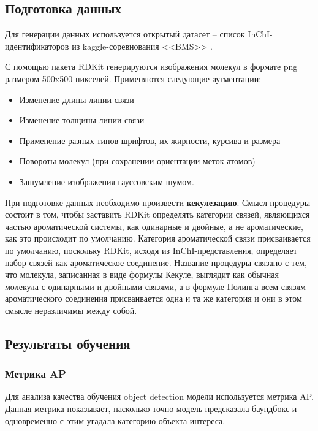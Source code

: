 \subsection{Подготовка данных}

Для генерации данных используется открытый датасет -- список InChI-идентификаторов из kaggle-соревнования <<BMS>> \cite{bms}.

С помощью пакета RDKit \cite{rdkit} генерируются изображения молекул в формате png размером 500x500 пикселей. Применяются следующие аугментации:

\begin{itemize}
	\item Изменение длины линии связи
	\item Изменение толщины линии связи
	\item Применение разных типов шрифтов, их жирности, курсива и размера
	\item Повороты молекул (при сохранении ориентации меток атомов)
	\item Зашумление изображения гауссовским шумом.
\end{itemize}

При подготовке данных необходимо произвести \textbf{кекулезацию}. Смысл процедуры состоит в том, чтобы заставить RDKit определять категории связей, являющихся частью ароматической системы, как одинарные и двойные, а не ароматические, как это происходит по умолчанию. Категория ароматической связи присваивается по умолчанию, поскольку RDKit, исходя из InChI-представления, определяет набор связей как ароматическое соединение. Название процедуры связано с тем, что молекула, записанная в виде формулы Кекуле, выглядит как обычная молекула с одинарными и двойными связями, а в формуле Полинга всем связям ароматического соединения присваивается одна и та же категория и они в этом смысле неразличимы между собой.

\subsection{Результаты обучения}

\subsubsection{Метрика AP}

Для анализа качества обучения object detection модели используется метрика AP. Данная метрика показывает, насколько точно модель предсказала баундбокс и одновременно с этим угадала категорию объекта интереса.

